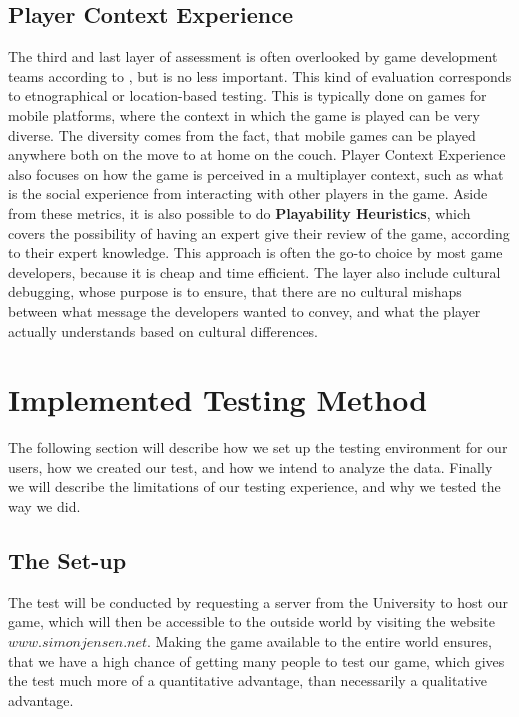 \subsection{Player Context Experience}
The third and last layer of assessment is often overlooked by game development teams according to \cite{gxmethod}, but is no less important.
This kind of evaluation corresponds to etnographical or location-based testing.
This is typically done on games for mobile platforms, where the context in which the game is played can be very diverse.
The diversity comes from the fact, that mobile games can be played anywhere both on the move to at home on the couch.
Player Context Experience also focuses on how the game is perceived in a multiplayer context, such as what is the social experience from interacting with other players in the game.
Aside from these metrics, it is also possible to do \textbf{Playability Heuristics}, which covers the possibility of having an expert give their review of the game, according to their expert knowledge.
This approach is often the go-to choice by most game developers, because it is cheap and time efficient\cite{gxmethod}.
The layer also include cultural debugging, whose purpose is to ensure, that there are no cultural mishaps between what message the developers wanted to convey, and what the player actually understands based on cultural differences.

\section{Implemented Testing Method}
\label{sec:test_method}

The following section will describe how we set up the testing environment for our users, how we created our test, and how we intend to analyze the data. Finally we will describe the limitations of our testing experience, and why we tested the way we did.

\subsection{The Set-up}

The test will be conducted by requesting a server from the University to host our game, which will then be accessible to the outside world by visiting the website $www.simonjensen.net$.
Making the game available to the entire world ensures, that we have a high chance of getting many people to test our game, which gives the test much more of a quantitative advantage, than necessarily a qualitative advantage.

